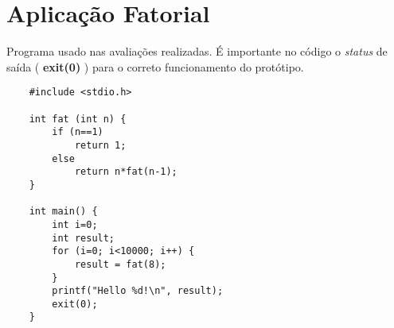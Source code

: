 \chapter{Aplicação Fatorial}
\label{anexo:fatorial}

Programa usado nas avaliações realizadas. É importante no código o \emph{status} de saída ( \textbf{exit(0)} ) para o correto funcionamento do protótipo.

\begin{scriptsize}
\begin{verbatim}
	#include <stdio.h>
	
	int fat (int n) {
		if (n==1)
			return 1;
		else
			return n*fat(n-1);
	}
	
	int main() {
		int i=0;
		int result;
		for (i=0; i<10000; i++) {
			result = fat(8);
		}
		printf("Hello %d!\n", result);
		exit(0);
	}
	
\end{verbatim}
\end{scriptsize}